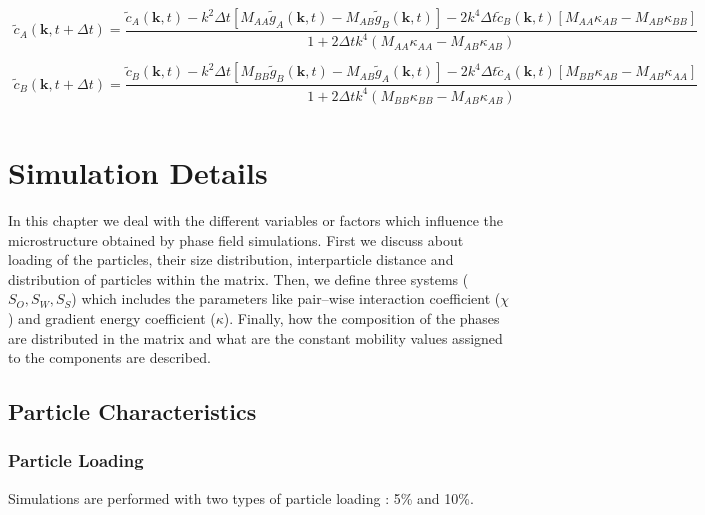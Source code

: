 \documentclass[12pt]{iiscthes}
\theoremstyle{definition}
\theoremstyle{definition}
\theoremstyle{remark}
\begin{document}
 \begin{eqnarray}\label{71}
\tilde{c}_A\left(\mathbf{k},t+\Delta t\right)=\dfrac{\tilde{c}_A\left(\mathbf{k},t\right)-k^2\Delta t\left[M_{AA}\tilde{g}_A\left(\mathbf{k},t\right)-M_{AB}\tilde{g}_B\left(\mathbf{k},t\right)\right]-2k^4\Delta t\tilde{c}_B\left(\mathbf{k},t\right)\left[M_{AA}\kappa_{AB}-M_{AB}\kappa_{BB}\right]}{1+2\Delta t k^4\left(M_{AA}\kappa_{AA}-M_{AB}\kappa_{AB}\right)}\nonumber\\
\end{eqnarray}
 \begin{eqnarray}\label{72}
\tilde{c}_B\left(\mathbf{k},t+\Delta t\right)=\dfrac{\tilde{c}_B\left(\mathbf{k},t\right)-k^2\Delta t\left[M_{BB}\tilde{g}_B\left(\mathbf{k},t\right)-M_{AB}\tilde{g}_A\left(\mathbf{k},t\right)\right]-2k^4\Delta t\tilde{c}_A\left(\mathbf{k},t\right)\left[M_{BB}\kappa_{AB}-M_{AB}\kappa_{AA}\right]}{1+2\Delta t k^4\left(M_{BB}\kappa_{BB}-M_{AB}\kappa_{AB}\right)}\nonumber\\
\end{eqnarray}

\chapter{Simulation Details}
In this chapter we deal with the different variables or factors which influence the microstructure obtained by phase field simulations. First we discuss about loading of the particles, their size distribution, interparticle distance and distribution of particles within the matrix. Then, we define three systems ($S_O, S_W, S_S$) which includes the parameters like pair--wise interaction coefficient ($\chi$) and gradient energy coefficient ($\kappa$). Finally, how the composition of the phases are distributed in the matrix and what are the constant mobility  values assigned to the components are described. 

\section{Particle Characteristics}
\subsection{Particle Loading}
Simulations are performed with two types of particle loading : 5\% and 10\%.
\end{document}
